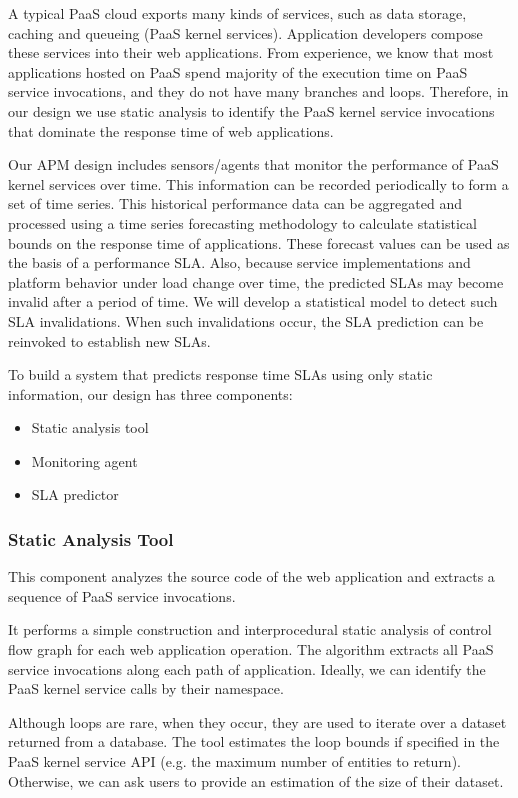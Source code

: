 \documentclass[11pt]{article}
\begin{document}
A typical PaaS cloud exports many kinds of services, such as data storage, caching and queueing (PaaS kernel
services). Application developers
compose these services into their web applications. 
From experience, we know that most applications hosted on PaaS spend majority of
the execution time on PaaS service invocations, and they do not have many branches and loops. Therefore, in our design we use
static analysis to identify the PaaS kernel service invocations that dominate the response time of web applications.

Our APM design includes sensors/agents that monitor the performance of PaaS kernel services over time. This
information can be recorded periodically to form a set of time series. This historical performance data can be
aggregated and processed using a time series forecasting methodology to calculate statistical bounds on the
response time of applications. These forecast values can be used as the basis of
a performance SLA.
Also, because service implementations and platform behavior under load change over time,
the predicted SLAs may become invalid after a period of time. We will develop a statistical model to detect such SLA invalidations.
When such invalidations occur, the SLA prediction can be reinvoked to establish new SLAs.

To build a system that predicts response time SLAs using only static information, our design has three components:
\begin{itemize}
\item Static analysis tool
\item Monitoring agent
\item SLA predictor
\end{itemize}

\subsubsection{Static Analysis Tool}
This component analyzes the source code of the web application and extracts a sequence of PaaS service invocations.

It performs a simple construction and interprocedural static analysis of control flow graph for each web application operation.
The algorithm extracts all PaaS service invocations along each path of application. 
Ideally, we can identify the PaaS kernel service calls
by their namespace.

Although loops are rare, when they occur, they are used to iterate over a dataset returned from a database. The tool estimates the loop 
bounds if specified in the PaaS kernel service API (e.g. the maximum number of entities to return). Otherwise, we can ask users to provide
an estimation of the size of their dataset.
\end{document}
